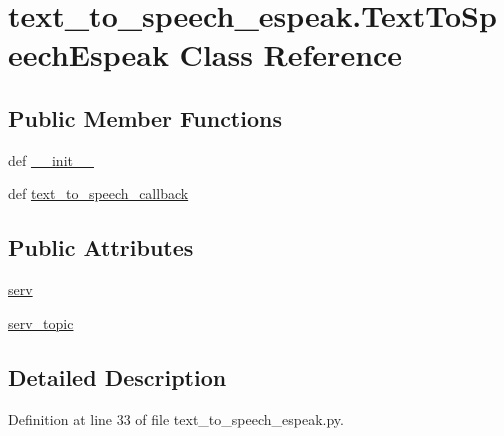 \hypertarget{classtext__to__speech__espeak_1_1TextToSpeechEspeak}{\section{text\-\_\-to\-\_\-speech\-\_\-espeak.\-Text\-To\-Speech\-Espeak Class Reference}
\label{classtext__to__speech__espeak_1_1TextToSpeechEspeak}
}
\subsection*{Public Member Functions}
\begin{DoxyCompactItemize}
\item 
def \hyperlink{classtext__to__speech__espeak_1_1TextToSpeechEspeak_ab0dc4457507c17b468ed52d9f3fa6db7}{\-\_\-\-\_\-init\-\_\-\-\_\-}
\item 
def \hyperlink{classtext__to__speech__espeak_1_1TextToSpeechEspeak_abba6fcd2694efcaa710a531e8f6af894}{text\-\_\-to\-\_\-speech\-\_\-callback}
\end{DoxyCompactItemize}
\subsection*{Public Attributes}
\begin{DoxyCompactItemize}
\item 
\hyperlink{classtext__to__speech__espeak_1_1TextToSpeechEspeak_a2d7125fa374df3f2464895e9912740e1}{serv}
\item 
\hyperlink{classtext__to__speech__espeak_1_1TextToSpeechEspeak_a90fad6605bb18dd67187858f7389bf13}{serv\-\_\-topic}
\end{DoxyCompactItemize}


\subsection{Detailed Description}


Definition at line 33 of file text\-\_\-to\-\_\-speech\-\_\-espeak.\-py.



